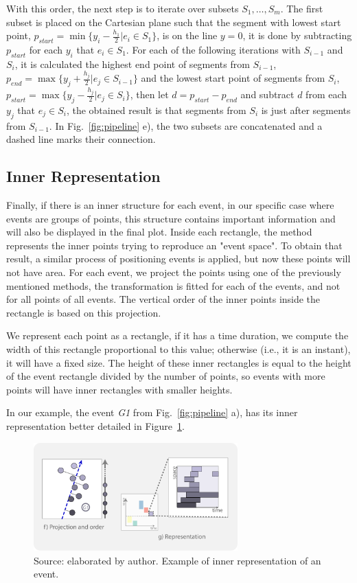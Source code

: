 %
With this order,
%
the next step is to iterate over subsets $S_1, \dots, S_m$. The first subset is placed on the Cartesian plane such that the segment with lowest start point, $p_{start} = \min \{ y_i - \frac{h_1}{2} | e_i \in S_1 \}$, is on the line $y = 0$, it is done by subtracting $p_{start}$ for each $y_i$ that $e_i \in S_1$.
%
For each of the following iterations with $S_{i - 1}$ and $S_i$, it is calculated the highest end point of segments from $S_{i - 1}$, $p_{end} = \max \{ y_j + \frac{h_j}{2}| e_j \in S_{i - 1}\}$ and the lowest start point of segments from $S_i$, $p_{start} = \max \{ y_j - \frac{h_j}{2}| e_j \in S_{i}\}$, then let $d = p_{start} - p_{end}$ and subtract $d$ from each $y_j$ that $e_j \in S_i$, the obtained result is that segments from $S_i$ is just after segments from $S_{i-1}$.
%
In Fig.~\ref{fig:pipeline} e), the two subsets are concatenated and a dashed line marks their connection. 

\subsection{Inner Representation}

Finally, if there is an inner structure for each event, in our specific case where events are groups of points,
%
this structure contains important information and will also be displayed in the final plot.
%
Inside each rectangle, the method represents the inner points trying to reproduce an "event space".
%
To obtain that result, a similar process of positioning events is applied, but now these points will not have area.
%
For each event, we project the points using one of the previously mentioned methods, the transformation is fitted for each of the events, and not for all points of all events. 
%
The vertical order of the inner points inside the rectangle is based on this projection. 

%
We represent each point as a rectangle, if it has a time duration, we compute the width of this rectangle proportional to this value; otherwise (i.e., it is an instant), it will have a fixed size. 
%
The height of these inner rectangles is equal to the height of the event rectangle divided by the number of points, so events with more points will have inner rectangles with smaller heights.

%
In our example, the event \textit{G1} from Fig.~\ref{fig:pipeline} a), has its inner representation better detailed in Figure~\ref{fig:inner-representation}.

\begin{figure}[h]
    \centering
    \includegraphics[width = 0.7\textwidth]{src/imgs/inner-representation.pdf}
    \caption{Source: elaborated by author. Example of inner representation of an event.}
    \label{fig:inner-representation}
\end{figure}


